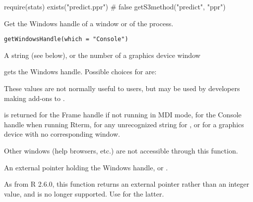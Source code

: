 %
\begin{Examples}
\begin{ExampleCode}
require(stats)
exists("predict.ppr") # false
getS3method("predict", "ppr")
\end{ExampleCode}
\end{Examples}
%
\begin{Description}\relax
Get the Windows handle of a window or of the \R{} process.
\end{Description}
%
\begin{Usage}
\begin{verbatim}
getWindowsHandle(which = "Console")
\end{verbatim}
\end{Usage}
%
\begin{Arguments}
\begin{ldescription}
\item[\code{which}] A string (see below), or the number of a 
graphics device window
\end{ldescription}
\end{Arguments}
%
\begin{Details}\relax
{} gets the Windows handle.
Possible choices for  are:

These values are not normally useful to users, but may be used by 
developers making add-ons to \R{}.

 is returned for the Frame handle if not running in MDI mode, 
for the Console handle when running Rterm, for any unrecognized 
string for , or for a graphics device with no 
corresponding window.

Other windows (help browsers, etc.) are not accessible 
through this function.
\end{Details}
%
\begin{Value}
An external pointer holding the Windows handle, or .
\end{Value}
%
\begin{Note}\relax
  
As from R 2.6.0, this function returns an external pointer rather than
an integer value, and  is no longer supported.
Use  for the latter.
\end{Note}
